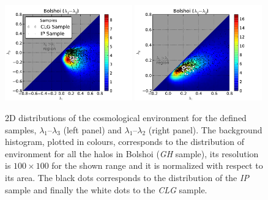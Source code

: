 \
\begin{figure}[htbp]
	\centering
	\includegraphics[trim = 0mm 0mm 15mm 0mm, clip, width=0.49\textwidth]
	{./figures/4_results/CLG_Environmet_L1L3.pdf}
	\includegraphics[trim = 0mm 0mm 15mm 0mm, clip, width=0.49\textwidth]
	{./figures/4_results/CLG_Environmet_L1L2.pdf}
	
	\caption{\small{2D distributions of the cosmological environment for
	the defined samples, $\lambda_1$--$\lambda_3$ (left panel) and 
	$\lambda_1$--$\lambda_2$ (right panel). The background histogram, 
	plotted in colours, corresponds to the distribution of environment
	for all the halos in Bolshoi (\textit{GH} sample), its resolution is
	$100\times 100$ for the shown range and it is normalized with respect 
	to its area. The black dots corresponds to the distribution of the 
	\textit{IP} sample and finally the white dots to the \textit{CLG}
	sample.}}
	\label{fig:2D_Samples_Eigenvalues}
\end{figure}


